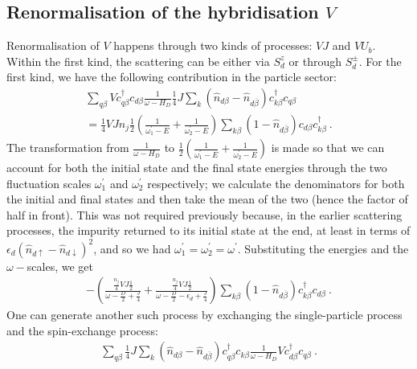 \documentclass{iopart}
\begin{document}
\subsection{Renormalisation of the hybridisation \(V\)}
Renormalisation of \(V\) happens through two kinds of processes: \(VJ\) and \(VU_b\). Within the first kind, the scattering can be either via \(S_d^z\) or through \(S_d^\pm\). For the first kind, we have the following contribution in the particle sector:
\begin{eqnarray}
	\sum_{q\beta} Vc^\dagger_{q\beta} c_{d\beta} \frac{1}{\omega - H_D}\frac{1}{4}J \sum_{k} \left(\hat n_{d\beta} - \hat n_{d\overline\beta}\right) c^\dagger_{k\beta}c_{q\beta} \nonumber\\
	= \frac{1}{4}V J n_j \frac{1}{2}\left(\frac{1}{\omega^\prime_1 - E} + \frac{1}{\omega^\prime_2 - E}\right)\sum_{k\beta} \left(1 - \hat n_{d\overline\beta}\right) c_{d\beta}c^\dagger_{k\beta}~.
\end{eqnarray}
The transformation from \(\frac{1}{\omega - H_D}\) to \(\frac{1}{2}\left(\frac{1}{\omega^\prime_1 - E} + \frac{1}{\omega^\prime_2 - E}\right)\) is made so that we can account for both the initial state and the final state energies through the two fluctuation scales \(\omega^\prime_1\) and \(\omega_2^\prime\) respectively; we calculate the denominators for both the initial and final states and then take the mean of the two (hence the factor of half in front). This was not required previously because, in the earlier scattering processes, the impurity returned to its initial state at the end, at least in terms of \(\epsilon_d \left( \hat n_{d \uparrow} - \hat n_{d \downarrow} \right)^2 \), and so we had \(\omega_1^\prime = \omega_2^\prime = \omega^\prime\).
Substituting the energies and the \(\omega-\)scales, we get
\begin{eqnarray}
	-\left(\frac{\frac{n_j}{4}V J \frac{1}{2}}{\omega - \frac{D}{2} + \frac{J}{4}} + \frac{\frac{n_j}{4}V J \frac{1}{2}}{\omega - \frac{D}{2} - \epsilon_d + \frac{J}{4}}\right)\sum_{k\beta}\left(1 - \hat n_{d\overline\beta}\right) c^\dagger_{k\beta} c_{d\beta}~.
\end{eqnarray}
One can generate another such process by exchanging the single-particle process and the spin-exchange process:
\begin{eqnarray}
	\sum_{q\beta} \frac{1}{4}J \sum_{k} \left(\hat n_{d\beta} - \hat n_{d\overline\beta}\right) c^\dagger_{q\beta}c_{k\beta} \frac{1}{\omega - H_D} V c^\dagger_{d\beta} c_{q\beta}~.
\end{eqnarray}
\end{document}
